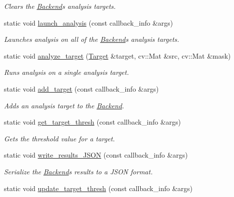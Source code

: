 \begin{DoxyCompactItemize}
\begin{DoxyCompactList}\small\item\em Clears the \hyperlink{class_backend}{Backend}\textquotesingle{}s analysis targets. \end{DoxyCompactList}\item 
static void \hyperlink{class_backend_acab7db3b3b0f34798a48ba22a7e3e9ff}{launch\+\_\+analysis} (const callback\+\_\+info \&args)
\begin{DoxyCompactList}\small\item\em Launches analysis on all of the \hyperlink{class_backend}{Backend}\textquotesingle{}s analysis targets. \end{DoxyCompactList}\item 
static void \hyperlink{class_backend_a149d05a4861bc09a73908f9817666586}{analyze\+\_\+target} (\hyperlink{struct_backend_1_1_target}{Target} \&target, cv\+::\+Mat \&src, cv\+::\+Mat \&mask)
\begin{DoxyCompactList}\small\item\em Runs analysis on a single analysis target. \end{DoxyCompactList}\item 
static void \hyperlink{class_backend_ad8eb1ddd04ee12fe1e720b09b4fc4c4e}{add\+\_\+target} (const callback\+\_\+info \&args)
\begin{DoxyCompactList}\small\item\em Adds an analysis target to the \hyperlink{class_backend}{Backend}. \end{DoxyCompactList}\item 
static void \hyperlink{class_backend_a7932975deb5e38ef957ef62112a730e4}{get\+\_\+target\+\_\+thresh} (const callback\+\_\+info \&args)
\begin{DoxyCompactList}\small\item\em Gets the threshold value for a target. \end{DoxyCompactList}\item 
static void \hyperlink{class_backend_a2bc5c7f6eb7a1c6ec5b5572410c4e81e}{write\+\_\+results\+\_\+\+J\+S\+ON} (const callback\+\_\+info \&args)
\begin{DoxyCompactList}\small\item\em Serialize the \hyperlink{class_backend}{Backend}\textquotesingle{}s results to a J\+S\+ON format. \end{DoxyCompactList}\item 
static void \hyperlink{class_backend_ad2db57d3d4eb38bfda56212c8465ca8a}{update\+\_\+target\+\_\+thresh} (const callback\+\_\+info \&args)

\end{DoxyCompactItemize}
